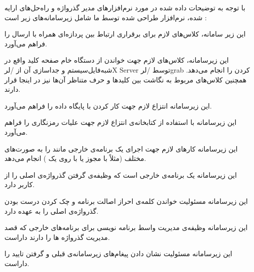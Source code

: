 


با توجه به توضیحات داده شده در مورد نرم‌افزار‌های مدیر گذرواژه و راه‌حل‌های ارایه شده، نرم‌افزار طراحی شده توسط ما شامل زیرسامانه‌های زیر است :



این زیر سامانه، کلاس‌های لازم برای برقراری ارتباط بین پردازه‌ای همراه با ارسال  را فراهم می‌آورد. 


این زیرسامانه، کلاس‌های لازم جهت خواندن از دستگاه خام صفحه کلید واقع در شبه‌فایل‌سیستم  و جداسازی آن از /لر{X Server} توسط /لر{grab} کردن را انجام می‌دهد. همچنین کلاس‌های مربوط به نگاشت بین کلید‌ها و حرف متناظر آن‌ها نیز در اینجا قرار دارند.


این زیرسامانه انتزاع لازم جهت کار کردن با پایگاه داده را فراهم می‌آورد. 


این زیرسامانه با استفاده از کتابخانه‌ی  انتزاع لازم جهت علیات رمز‌نگاری را فراهم می‌آورد.


این زیرسامانه کارهای لازم جهت اجرای یک برنامه‌ی خارجی مانند  را به صورت‌های مختلف (مثلاً با مجوز  یا با  روی یک ) انجام می‌دهد.


این زیرسامانه یک برنامه‌ی خارجی است که وظیفه‌ی گرفتن گذرواژه‌ی اصلی را از کاربر دارد. 


این زیرسامانه مسئولیت خواندن کلمه‌ی احراز اصالت برنامه و چک کردن درست بودن گذرواژه‌ی اصلی را به عهده دارد.


این زیرسامانه وظیفه‌ی مدیریت واسط برنامه نویسی برای برنامه‌های خارجی که قصد مدیریت گذرواژه ها را دارند داراست.


این زیرسامانه مسئولیت نشان دادن پیغام‌های زیرسامانه‌ی قبلی و گرفتن تایید را داراست.


